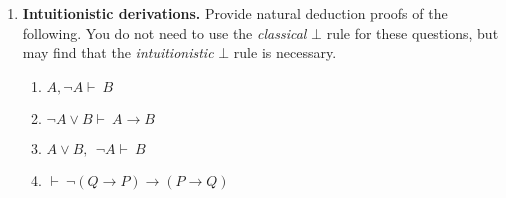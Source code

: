 \documentclass[11pt]{report}
\begin{document}
\begin{enumerate}
	\item \textbf{Intuitionistic derivations.} Provide natural deduction proofs of the following. You do not need to use the \emph{classical} $\bot$ rule for these questions, but may find that the \emph{intuitionistic} $\bot$ rule is necessary.
	 
	\begin{enumerate}
		\item $ A, \neg  A\vdash \ B$ 
		\item $\neg  A\lor  B \vdash \ A\to B$ 
		\item $ A\lor  B,\ \ \neg A\vdash \ B$ 
		\item $ \vdash \ \lnot(Q \to P) \to (P \to Q)$
	\end{enumerate}

\end{enumerate}	
\end{document}
